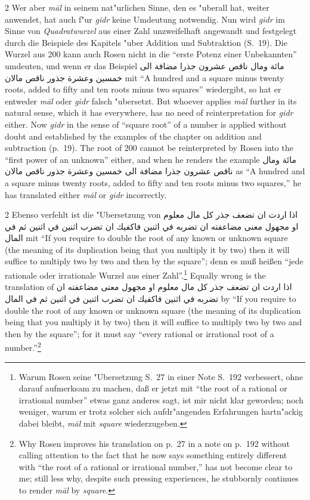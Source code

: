 \documentclass[10pt,a4paper]{article}
\renewcommand{\switchcolumn}{\syncronize\nointerlineskip\columnbreak}
\newcommand{\RL}[1]{\beginR#1\endR}
\newcommand{\ar}[1]{{\arabicfont\RL{#1}}}
\newcommand{\enquote}[1]{``#1''}
\begin{document}
\begin{paracol}{2}
Wer aber \textit{m\=al} in seinem nat"urlichen Sinne, den es "uberall hat, weiter anwendet, hat auch f"ur \textit{gidr} keine Umdeutung notwendig. Nun wird \textit{gidr} im Sinne von \textit{Quadratwurzel} aus einer Zahl unzweifelhaft angewandt und festgelegt durch die Beispiele des Kapitels "uber Addition und Subtraktion (S.\ 19). Die Wurzel aus 200 kann auch Rosen nicht in die \enquote{erste Potenz einer Unbekannten} umdeuten, und wenn er das Beispiel \ar{مائة ومال ناقص عشرون جذرا مضافة الى خمسين وعشرة جذور ناقص مالان} mit \enquote{A hundred and a square minus twenty roots, added to fifty and ten roots minus two squares} wiedergibt, so hat er entweder \textit{m\=al} oder \textit{gidr} falsch "ubersetzt.
\switchcolumn
But whoever applies \textit{m\=al} further in its natural sense, which it has everywhere, has no need of reinterpretation for \textit{gidr} either. Now \textit{gidr} in the sense of ``square root'' of a number is applied without doubt and established by the examples of the chapter on addition and subtraction (p.\ 19). The root of 200 cannot be reinterpreted by Rosen into the ``first power of an unknown'' either, and when he renders the example \ar{مائة ومال ناقص عشرون جذرا مضافة الى خمسين وعشرة جذور ناقص مالان} as ``A hundred and a square minus twenty roots, added to fifty and ten roots minus two squares,'' he has translated either \textit{m\=al} or \textit{gidr} incorrectly.
\end{paracol}

\begin{paracol}{2}
Ebenso verfehlt ist die "Ubersetzung von \ar{اذا اردت ان تضعف جذر كل مال معلوم او مجهول معنى مضاعفته ان تضربه في اثنين فاكفيك ان تضرب اثنين في اثنين ثم في المال} mit \enquote{If you require to double the root of any known or unknown square (the meaning of its duplication being that you multiply it by two) then it will suffice to multiply two by two and then by the square}; denn es mu\ss{} hei\ss{}en \enquote{jede rationale oder irrationale Wurzel aus einer Zahl}.\footnote{Warum Rosen seine "Ubersetzung S.\ 27 in einer Note S.\ 192 verbessert, ohne darauf aufmerksam zu machen, da\ss{} er jetzt mit \enquote{the root of a rational or irrational number} etwas ganz anderes sagt, ist mir nicht klar geworden; noch weniger, warum er trotz solcher sich aufdr"angenden Erfahrungen hartn"ackig dabei bleibt, \textit{m\=al} mit \textit{square} wiederzugeben.}
\switchcolumn
Equally wrong is the translation of \ar{اذا اردت ان تضعف جذر كل مال معلوم او مجهول معنى مضاعفته ان تضربه في اثنين فاكفيك ان تضرب اثنين في اثنين ثم في المال} by ``If you require to double the root of any known or unknown square (the meaning of its duplication being that you multiply it by two) then it will suffice to multiply two by two and then by the square''; for it must say ``every rational or irrational root of a number.''\footnote{Why Rosen improves his translation on p.\ 27 in a note on p.\ 192 without calling attention to the fact that he now says something entirely different with ``the root of a rational or irrational number,'' has not become clear to me; still less why, despite such pressing experiences, he stubbornly continues to render \textit{m\=al} by \textit{square}.}
\end{paracol}
\end{document}
